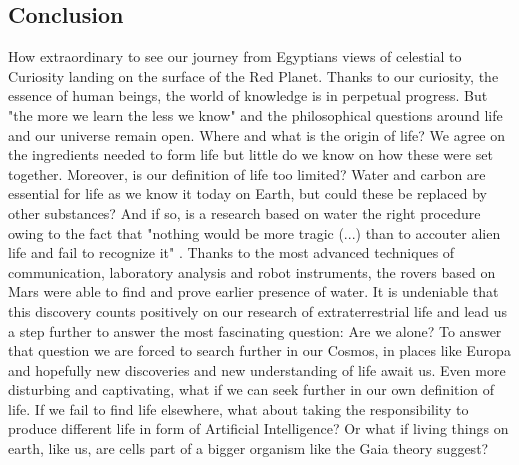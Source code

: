 \subsection*{Conclusion}

How extraordinary to see our journey from Egyptians views of celestial to Curiosity landing on the surface of the Red Planet. 
Thanks to our curiosity, the essence of human beings, the world of knowledge is in perpetual progress. 
But "the more we learn the less we know" and the philosophical questions around life and our universe remain open. 
Where and what is the origin of life? 
We agree on the ingredients needed to form life but little do we know on how these were set together. 
Moreover, is our definition of life too limited? 
Water and carbon are essential for life as we know it today on Earth, but could these be replaced by other substances? 
And if so, is a research based on water the right procedure owing to the fact that "nothing would be more tragic (...) than to accouter alien life and fail to recognize it" \cite{OForm3}. 
Thanks to the most advanced techniques of communication, laboratory analysis and robot instruments, the rovers based on Mars were able to find and prove earlier presence of water.
It is undeniable that this discovery counts positively on our research of extraterrestrial life and lead us a step further to answer the most fascinating question:  Are we alone? 
To answer that question we are forced to search further in our Cosmos, in places like Europa and hopefully new discoveries and new understanding of life await us. 
Even more disturbing and captivating, what if we can seek further in our own definition of life. 
If we fail to find life elsewhere, what about taking the responsibility to produce different life in form of Artificial Intelligence? 
Or what if living things on earth, like us, are cells part of a bigger organism like the Gaia theory suggest?